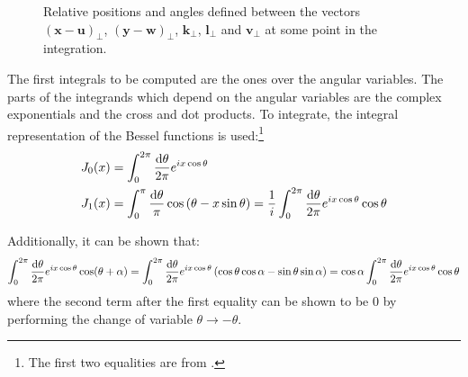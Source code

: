 \begin{figure}
    \centering	%
    
    \caption{Relative positions and angles defined between the vectors $(\mathbf{x}-\mathbf{u})_\perp$, $(\mathbf{y}-\mathbf{w})_\perp$, $\mathbf{k}_\perp$, $\mathbf{l}_\perp$ and $\mathbf{v}_\perp$ at some point in the integration.}
    \label{fig:angles}
\end{figure}

The first integrals to be computed are the ones over the angular variables. The parts of the integrands which depend on the angular variables are the complex exponentials and the cross and dot products. To integrate, the integral representation of the Bessel functions is used:\footnote{The first two equalities are from \cite{arfken2005mathematical}.}
\begin{subequations}
\begin{align}
 J_0 (x) & = \int_0^{2\pi} \frac{\mathop{}\!\mathrm{d} \theta}{2 \pi} e^{ix \cos \theta} \\
 J_1(x) & = \int_0^\pi \frac{\mathop{}\!\mathrm{d} \theta}{\pi} \cos \left( \theta - x \sin \theta \right) = \frac{1}{i} \int_0^{2 \pi} \frac{\mathop{}\!\mathrm{d} \theta}{2 \pi} e^{i x \cos \theta} \cos \theta
\end{align}
\label{eq:bessel_integrals}
\end{subequations}

Additionally, it can be shown that:
\begin{equation}
	\int_0^{2\pi} \frac{\mathop{}\!\mathrm{d} \theta}{2 \pi} e^{i x \cos \theta} \cos (\theta + \alpha) = \int_0^{2\pi} \frac{\mathop{}\!\mathrm{d} \theta}{2 \pi} e^{i x \cos \theta} \left(\cos \theta \cos \alpha - \sin \theta \sin \alpha \right) = \cos \alpha \int_0^{2\pi} \frac{\mathop{}\!\mathrm{d} \theta}{2 \pi} e^{i x \cos \theta} \cos \theta
\label{eq:J1_cos_alpha}
\end{equation}
where the second term after the first equality can be shown to be $0$ by performing the change of variable $\theta \to - \theta$.


